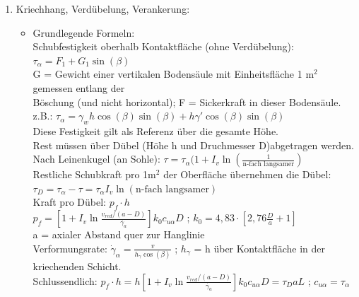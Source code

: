 \documentclass[fleqn,twoside]{article}
\begin{document}
\begin{enumerate}
\item Kriechhang, Verdübelung, Verankerung:\\
		\begin{itemize}
		
		\item Grundlegende Formeln:\\
		Schubfestigkeit oberhalb Kontaktfläche (ohne Verdübelung):\\
		\hspace*{1cm} $\tau_\alpha = F_1 + G_1 \sin(\beta)$\\
		\hspace*{1cm} G = Gewicht einer vertikalen Bodensäule mit Einheitsfläche 1 m$^2$ gemessen entlang der\\ 
		\hspace*{1cm} Böschung (und nicht horizontal); F = Sickerkraft in dieser Bodensäule.\\
		\hspace*{1.5cm} z.B.: $\tau_\alpha = \gamma_w h \cos(\beta) \sin(\beta) + h \gamma' \cos(\beta) \sin(\beta)$\\
		\hspace*{1cm} Diese Festigkeit gilt als Referenz über die gesamte Höhe.\\
		\hspace*{1cm} Rest müssen über Dübel (Höhe h und Druchmesser D)abgetragen werden.\\
		Nach Leinenkugel (an Sohle): $\tau = \tau_\alpha (1+ I_v \ln(\frac{1}{\text{n-fach langsamer}})$\\
		Restliche Schubkraft pro 1m$^2$ der Oberfläche übernehmen die Dübel:\\ 
		\hspace*{1cm}$\tau_D = \tau_\alpha - \tau = \tau_\alpha I_v \ln (\text{n-fach langsamer})$\\
		Kraft pro Dübel: $p_f \cdot h$\\
		\hspace*{1cm} $p_f = \left[1+I_v \ln \frac{v_{red} / (a-D)}{\dot{\gamma_a}}\right] k_0 c_{u\alpha} D$ ; $k_0 = 4,83 \cdot \left[ 2,76 \frac{D}{a}+1 \right]$\\ 
		\hspace*{1cm} a = axialer Abstand quer zur Hanglinie\\
		Verformungsrate: $\dot{\gamma}_\alpha = \frac{v}{h_\gamma \cos(\beta)}$ ; $h_\gamma$ = h über Kontaktfläche in der kriechenden Schicht.\\
		Schlussendlich: $p_f \cdot h = h \left[1+I_v \ln \frac{v_{red} / (a-D)}{\dot{\gamma_a}}\right] k_0 c_{u\alpha} D = \tau_D a L$ ; $c_{u\alpha}=\tau_\alpha$
		

\end{itemize}
\end{enumerate}
\end{document}
